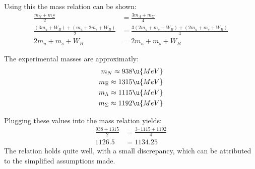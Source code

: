 \documentclass[exb,en]{exercise_5.0}
\begin{document}
Using this the mass relation can be shown:
\begin{align*}
    \frac{m_N + m_\Xi}{2} &= \frac{3m_\Lambda + m_\Sigma}{4}\\
    \frac{(3 m_u + W_B) + (m_u + 2m_s + W_B)}{2} &= \frac{3(2m_u + m_s+ W_B) + (2 m_u + m_s + W_B)}{4}\\    
    2m_u + m_s + W_B &= 2m_u + m_s+ W_B
\end{align*}

The experimental masses are approximatly:
\begin{align*}
    m_N \approx 938 \u{MeV}\\
    m_\Xi \approx 1315 \u{MeV}\\
    m_\Lambda \approx 1115 \u{MeV}\\
    m_\Sigma \approx 1192 \u{MeV}
\end{align*}

Plugging these values into the mass relation yields:
\begin{align*}
    \frac{938 + 1315}{2} &= \frac{3\cdot 1115+ 1192}{4}\\
    1126.5 &= 1134.25
\end{align*}
The relation holds quite well, with a small discrepancy, which can be attributed to the simplified assumptions made.
\end{document}
